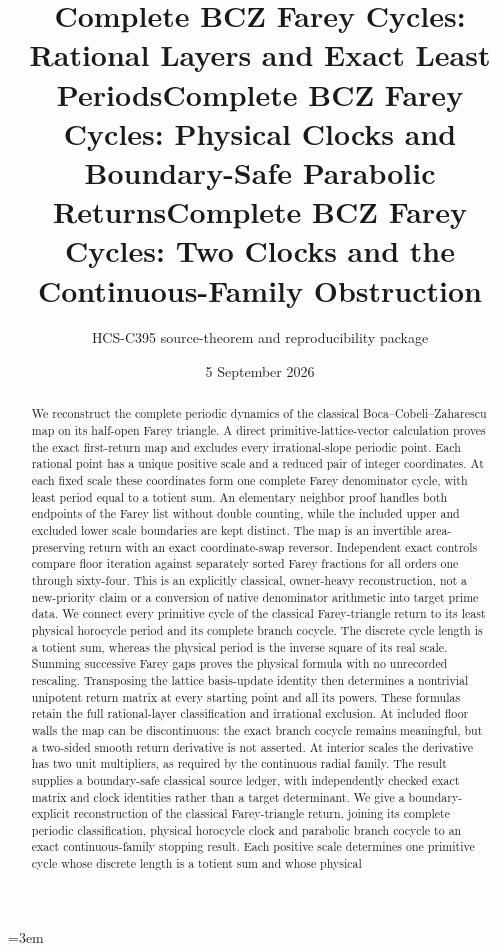 \documentclass[10pt]{article}
\title{Complete BCZ Farey Cycles: Rational Layers and Exact Least Periods}
\title{Complete BCZ Farey Cycles: Physical Clocks and Boundary-Safe Parabolic Returns}
\title{Complete BCZ Farey Cycles: Two Clocks and the Continuous-Family Obstruction}
\author{HCS-C395 source-theorem and reproducibility package}
\date{5 September 2026}
\begin{document}
\emergencystretch=3em
\maketitle
\begin{abstract}
\ifcase\CRevisionRound
We reconstruct the complete periodic dynamics of the classical
Boca--Cobeli--Zaharescu map on its half-open Farey triangle.
A direct primitive-lattice-vector calculation proves the exact
first-return map and excludes every irrational-slope periodic point.
Each rational point has a unique positive scale and a reduced pair of
integer coordinates. At each fixed scale these coordinates form one
complete Farey denominator cycle, with least period equal to a totient
sum. An elementary neighbor proof handles both endpoints of the Farey
list without double counting, while the included upper and excluded lower
scale boundaries are kept distinct. The map is an invertible area-preserving
return with an exact coordinate-swap reversor. Independent exact controls
compare floor iteration against separately sorted Farey fractions for
all orders one through sixty-four. This is an explicitly classical,
owner-heavy reconstruction, not a new-priority claim or a conversion of
native denominator arithmetic into target prime data.
\or
We connect every primitive cycle of the classical Farey-triangle return
to its least physical horocycle period and its complete branch cocycle.
The discrete cycle length is a totient sum, whereas the physical period
is the inverse square of its real scale. Summing successive Farey gaps
proves the physical formula with no unrecorded rescaling. Transposing
the lattice basis-update identity then determines a nontrivial unipotent
return matrix at every starting point and all its powers. These formulas
retain the full rational-layer classification and irrational exclusion.
At included floor walls the map can be discontinuous: the exact branch
cocycle remains meaningful, but a two-sided smooth return derivative is
not asserted. At interior scales the derivative has two unit multipliers,
as required by the continuous radial family. The result supplies a
boundary-safe classical source ledger, with independently checked exact
matrix and clock identities rather than a target determinant.
\else
We give a boundary-explicit reconstruction of the classical
Farey-triangle return, joining its complete periodic classification,
physical horocycle clock and parabolic branch cocycle to an exact
continuous-family stopping result. Each positive scale determines one
primitive cycle whose discrete length is a totient sum and whose physical

\end{abstract}
\end{document}
